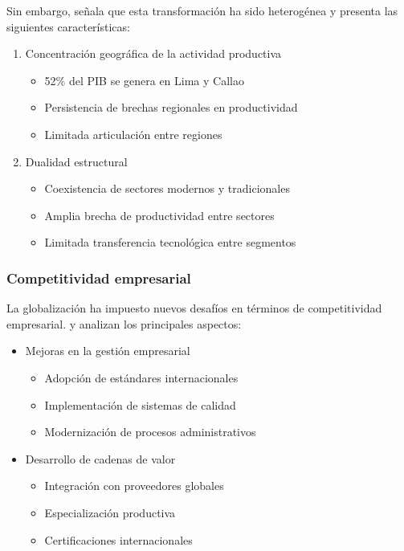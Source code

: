 \documentclass[12pt, a4paper]{article}
\begin{document}
Sin embargo, \textcite{gonzales2019} señala que esta transformación ha sido heterogénea y presenta las siguientes características:

\begin{enumerate}
    \item Concentración geográfica de la actividad productiva
    \begin{itemize}
        \item 52\% del PIB se genera en Lima y Callao
        \item Persistencia de brechas regionales en productividad
        \item Limitada articulación entre regiones
    \end{itemize}
    
    \item Dualidad estructural
    \begin{itemize}
        \item Coexistencia de sectores modernos y tradicionales
        \item Amplia brecha de productividad entre sectores
        \item Limitada transferencia tecnológica entre segmentos
    \end{itemize}
\end{enumerate}

\subsubsection{Competitividad empresarial}
La globalización ha impuesto nuevos desafíos en términos de competitividad empresarial. \textcite{torres2021} y \textcite{ramirez2020} analizan los principales aspectos:

\begin{itemize}
    \item Mejoras en la gestión empresarial
    \begin{itemize}
        \item Adopción de estándares internacionales
        \item Implementación de sistemas de calidad
        \item Modernización de procesos administrativos
    \end{itemize}
    
    \item Desarrollo de cadenas de valor
    \begin{itemize}
        \item Integración con proveedores globales
        \item Especialización productiva
        \item Certificaciones internacionales
    \end{itemize}
\end{itemize}
\end{document}
